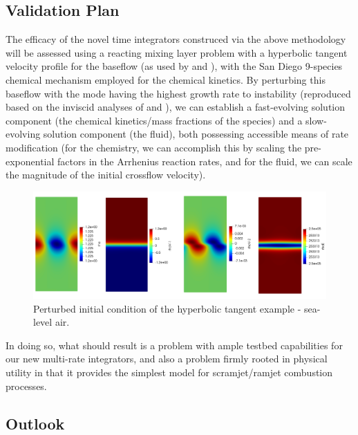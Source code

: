 \subsection{Validation Plan}

The efficacy of the novel time integrators construced via the above methodology will
be assessed using a reacting mixing layer problem with a hyperbolic tangent velocity profile
for the baseflow (as used by \cite{michalke1964inviscid} and \cite{blumen1970shear}), with
the San Diego 9-species chemical mechanism \cite{sandiego} employed for the chemical kinetics. By perturbing
this baseflow with the mode having the highest growth rate to instability (reproduced based
on the inviscid analyses of \cite{michalke1964inviscid} and \cite{blumen1970shear}), we can
establish a fast-evolving solution component (the chemical kinetics/mass fractions of the
species) and a slow-evolving solution component (the fluid), both possessing accessible
means of rate modification (for the chemistry, we can accomplish this by scaling the
pre-exponential factors in the Arrhenius reaction rates, and for the fluid, we can scale
the magnitude of the initial crossflow velocity).
\begin{figure}
\centering
\includegraphics[width=0.9\linewidth,trim=4 4 4 4,clip]{figures/hyperbolic_tangent_air.png}
\caption{Perturbed initial condition of the hyperbolic tangent example - sea-level air.}
\label{fig:hyperbolic_cold_rhov2}
\end{figure}
In doing so, what should result is a problem with ample testbed capabilities for our
new multi-rate integrators, and also a problem firmly rooted in physical utility in that
it provides the simplest model for scramjet/ramjet combustion processes.

\subsection{Outlook}

